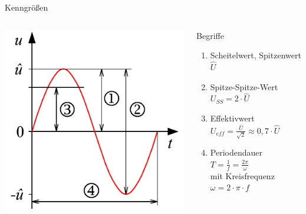 \begin{frame}{Kenngrößen}
  \begin{columns}[c]
    \includegraphics[width=\textwidth,height=\textheight,keepaspectratio]{a11/Sinusspannung.pdf}
    {\tiny \hyperlink{refs}{\cite{wm}}}
    \begin{block}{Begriffe}
      \begin{enumerate}
        \item Scheitelwert, Spitzenwert $\hat{U}$
        \item Spitze-Spitze-Wert $U_{SS} = 2 \cdot \hat{U}$
        \item Effektivwert $U_{eff} = \frac{\hat{U}}{\sqrt{2}} \approx 0,7 \cdot \hat{U}$
        \item Periodendauer $T = \frac{1}{f} = \frac{2\pi}{\omega}$\\
          mit Kreisfrequenz $\omega = 2\cdot\pi \cdot f$
      \end{enumerate}
    \end{block}
  \end{columns}
\end{frame}


